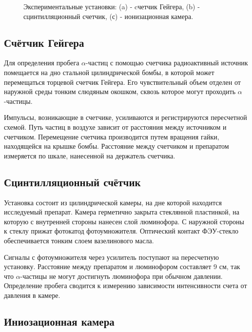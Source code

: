 \documentclass{article}
\begin{document}
\begin{figure}[h!]
{\begin{subfloatrow}[3]
			\end{subfloatrow}
		}
		{\caption{Экспериментальные установки: (a) - cчетчик Гейгера, (b) - сцинтилляционный счетчик, (с) - ионизационная камера.}}
	\end{figure}
	

	
\subsection{Счётчик Гейгера}

    Для определения пробега $\alpha$-частиц с помощью счетчика радиоактивный источник помещается на дно стальной цилиндрической бомбы, в которой может перемещаться торцевой счетчик Гейгера. Его чувствительный объем отделен от наружной среды тонким слюдяным
    окошком, сквозь которое могут проходить $\alpha$-частицы.


    Импульсы, возникающие в счетчике, усиливаются и регистрируются пересчетной схемой. Путь частиц в воздухе зависит от расстояния
    между источником и счетчиком. Перемещение счетчика производится путем вращения гайки, находящейся на крышке бомбы. Расстояние
    между счетчиком и препаратом измеряется по шкале, нанесенной на держатель счетчика.



\subsection{Сцинтилляционный счётчик}

    Установка состоит из цилиндрической камеры, на дне которой находится исследуемый препарат. Камера герметично закрыта стеклянной пластинкой, на которую с внутренней стороны нанесен слой люминофора. С наружной стороны к стеклу прижат фотокатод фотоумножителя. Оптический контакт ФЭУ-стекло обеспечивается тонким слоем вазелинового масла.
        
    
    Сигналы с фотоумножителя через усилитель поступают на пересчетную установку. Расстояние между препаратом и люминофором составляет 9 см, так что $\alpha$-частицы не могут достигнуть люминофора при обычном давлении. Определение пробега сводится к измерению зависимости интенсивности счета от давления в камере.


    
\subsection{Иниозационная камера}
\end{document}
